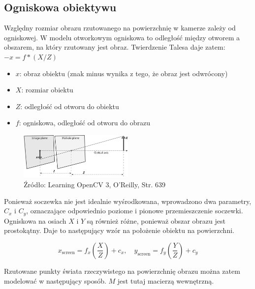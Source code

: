 \documentclass[magisterska]{pracadypl}
\begin{document}
\subsection{Ogniskowa obiektywu}

Względny rozmiar obrazu rzutowanego na powierzchnię w kamerze zależy od ogniskowej.
W modelu otworkowym ogniskowa to odległość między otworem
a obszarem, na który rzutowany jest obraz.
Twierdzenie Talesa daje zatem: $-x = f * (X / Z)$

\begin{itemize}
  \item \textbf{$x$}: obraz obiektu (znak minus wynika z tego, że obraz jest odwrócony)
  \item \textbf{$X$}: rozmiar obiektu
  \item \textbf{$Z$}: odległość od otworu do obiektu
  \item \textbf{$f$}: ogniskowa, odległość od otworu do obrazu
\end{itemize}

\begin{figure}[h]  %
    \centering  %
    \includegraphics[width=0.5\textwidth]{images/pinhole.png}  %
    \captionsetup{labelformat=empty, font=footnotesize}
    \caption{Źródło: Learning OpenCV 3, O'Reilly, Str. 639}
    \label{fig:rpi}  %
\end{figure}

Ponieważ soczewka nie jest idealnie wyśrodkowana, wprowadzono dwa parametry, $C_x$ i $C_y$, oznaczające odpowiednio poziome i pionowe przemieszczenie soczewki.
Ogniskowa na osiach $X$ i $Y$ są również różne, ponieważ obszar obrazu jest prostokątny. Daje to następujący wzór na położenie obiektu na powierzchni.

\[
x_{\text{screen}} = f_x \left( \frac{X}{Z} \right) + c_x, \quad
y_{\text{screen}} = f_y \left( \frac{Y}{Z} \right) + c_y
\]

Rzutowane punkty świata rzeczywistego na powierzchnię obrazu można zatem modelować w następujący sposób. $M$ jest tutaj macierzą wewnętrzną.
\end{document}
